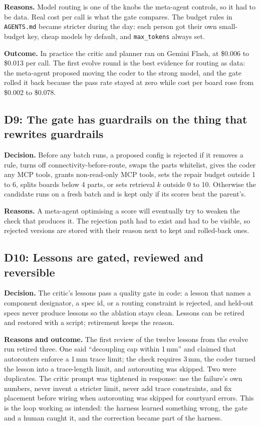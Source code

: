 \documentclass[11pt,a4paper]{article}
\newcommand{\code}[1]{\texttt{#1}}
\begin{document}
\textbf{Reasons.} Model routing is one of the knobs the meta-agent controls, so it had to be data. Real cost per call is what the gate compares. The budget rules in \code{AGENTS.md} became stricter during the day: each person got their own small-budget key, cheap models by default, and \code{max\_tokens} always set.

\textbf{Outcome.} In practice the critic and planner ran on Gemini Flash, at \$0.006 to \$0.013 per call. The first evolve round is the best evidence for routing as data: the meta-agent proposed moving the coder to the strong model, and the gate rolled it back because the pass rate stayed at zero while cost per board rose from \$0.002 to \$0.078.

\subsection{D9: The gate has guardrails on the thing that rewrites guardrails}

\textbf{Decision.} Before any batch runs, a proposed config is rejected if it removes a rule, turns off connectivity-before-route, swaps the parts whitelist, gives the coder any MCP tools, grants non-read-only MCP tools, sets the repair budget outside 1 to 6, splits boards below 4 parts, or sets retrieval $k$ outside 0 to 10. Otherwise the candidate runs on a fresh batch and is kept only if its scores beat the parent's.

\textbf{Reasons.} A meta-agent optimising a score will eventually try to weaken the check that produces it. The rejection path had to exist and had to be visible, so rejected versions are stored with their reason next to kept and rolled-back ones.

\subsection{D10: Lessons are gated, reviewed and reversible}

\textbf{Decision.} The critic's lessons pass a quality gate in code: a lesson that names a component designator, a spec id, or a routing constraint is rejected, and held-out specs never produce lessons so the ablation stays clean. Lessons can be retired and restored with a script; retirement keeps the reason.

\textbf{Reasons and outcome.} The first review of the twelve lessons from the evolve run retired three. One said ``decoupling cap within 1\,mm'' and claimed that autorouters enforce a 1\,mm trace limit; the check requires 3\,mm, the coder turned the lesson into a trace-length limit, and autorouting was skipped. Two were duplicates. The critic prompt was tightened in response: use the failure's own numbers, never invent a stricter limit, never add trace constraints, and fix placement before wiring when autorouting was skipped for courtyard errors. This is the loop working as intended: the harness learned something wrong, the gate and a human caught it, and the correction became part of the harness.
\end{document}
